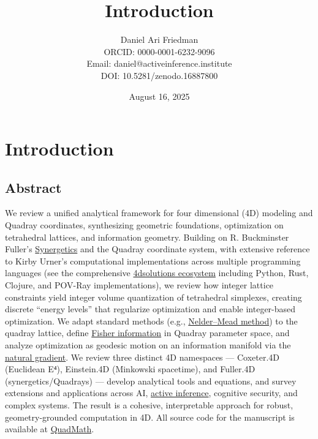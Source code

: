 \documentclass[
  10pt,
]{article}
\title{Introduction}
\author{Daniel Ari Friedman\\ ORCID: 0000-0001-6232-9096\\ Email: daniel@activeinference.institute\\ DOI: 10.5281/zenodo.16887800}
\date{August 16, 2025}
\begin{document}
\maketitle

{
\hypersetup{linkcolor=black}
\setcounter{tocdepth}{3}
\tableofcontents
}
\hypertarget{introduction}{%
\section{Introduction}\label{introduction}}

\hypertarget{abstract}{%
\subsection{Abstract}\label{abstract}}

We review a unified analytical framework for four dimensional (4D)
modeling and Quadray coordinates, synthesizing geometric foundations,
optimization on tetrahedral lattices, and information geometry. Building
on R. Buckminster Fuller's
\href{https://en.wikipedia.org/wiki/Synergetics_(Fuller)}{Synergetics}
and the Quadray coordinate system, with extensive reference to Kirby
Urner's computational implementations across multiple programming
languages (see the comprehensive
\href{https://github.com/4dsolutions}{4dsolutions ecosystem} including
Python, Rust, Clojure, and POV-Ray implementations), we review how
integer lattice constraints yield integer volume quantization of
tetrahedral simplexes, creating discrete ``energy levels'' that
regularize optimization and enable integer-based optimization. We adapt
standard methods (e.g.,
\href{https://en.wikipedia.org/wiki/Nelder\%E2\%80\%93Mead_method}{Nelder--Mead
method}) to the quadray lattice, define
\href{https://en.wikipedia.org/wiki/Fisher_information}{Fisher
information} in Quadray parameter space, and analyze optimization as
geodesic motion on an information manifold via the
\href{https://en.wikipedia.org/wiki/Natural_gradient}{natural gradient}.
We review three distinct 4D namespaces --- Coxeter.4D (Euclidean E⁴),
Einstein.4D (Minkowski spacetime), and Fuller.4D (synergetics/Quadrays)
--- develop analytical tools and equations, and survey extensions and
applications across AI,
\href{https://welcome.activeinference.institute/}{active inference},
cognitive security, and complex systems. The result is a cohesive,
interpretable approach for robust, geometry-grounded computation in 4D.
All source code for the manuscript is available at
\href{https://github.com/docxology/quadmath}{QuadMath}.
\end{document}
